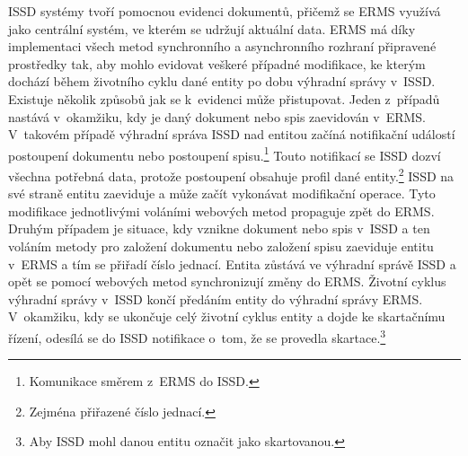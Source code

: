 \documentclass[
  master,
  field=ainfp,
  biblatex,
  language=czech,
  glossaries,
  theorems=false,
  index
]{kidiplom}
\begin{document}
ISSD systémy tvoří pomocnou evidenci dokumentů, přičemž se ERMS využívá jako centrální systém, ve kterém se udržují aktuální data. ERMS má díky implementaci všech metod synchronního a asynchronního rozhraní připravené prostředky tak, aby mohlo evidovat veškeré případné modifikace, ke kterým dochází během životního cyklu dané entity po dobu výhradní správy v~ISSD. Existuje několik způsobů jak se k~evidenci může přistupovat. Jeden z~případů nastává v~okamžiku, kdy je daný dokument nebo spis zaevidován v~ERMS. V~takovém případě výhradní správa ISSD nad entitou začíná notifikační událostí postoupení dokumentu nebo postoupení spisu.\footnote{Komunikace směrem z~ERMS do ISSD.} Touto notifikací se ISSD dozví všechna potřebná data, protože postoupení obsahuje profil dané entity.\footnote{Zejména přiřazené číslo jednací.} ISSD na své straně entitu zaeviduje a může začít vykonávat modifikační operace. Tyto modifikace jednotlivými voláními webových metod propaguje zpět do ERMS. Druhým případem je situace, kdy vznikne dokument nebo spis v~ISSD a ten voláním metody pro založení dokumentu nebo založení spisu zaeviduje entitu v~ERMS a tím se přiřadí číslo jednací. Entita zůstává ve výhradní správě ISSD a opět se pomocí webových metod synchronizují změny do ERMS. Životní cyklus výhradní správy v~ISSD končí předáním entity do výhradní správy ERMS. V~okamžiku, kdy se ukončuje celý životní cyklus entity a dojde ke skartačnímu řízení, odesílá se do ISSD notifikace o~tom, že se provedla skartace.\footnote{Aby ISSD mohl danou entitu označit jako skartovanou.}

\begin{table}
\begin{center}
\caption{Události povinně implementované na straně ISSD}\label{tab:IssdEvents}
\end{center}
\end{table}
\end{document}
